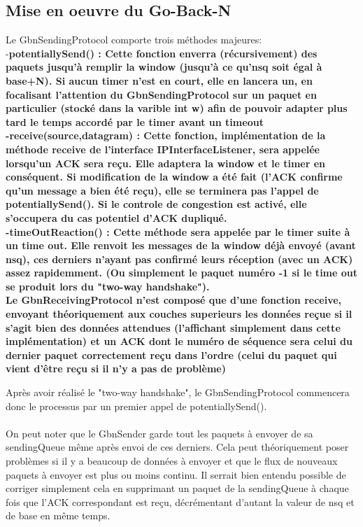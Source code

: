 \documentclass[11pt]{article}
\begin{document}
\subsection{Mise en oeuvre du Go-Back-N}
Le GbnSendingProtocol comporte trois méthodes majeures: \\
-\bfseries potentiallySend() \mdseries : Cette fonction enverra (récursivement) des paquets jusqu'à remplir la window (jusqu'à ce qu'nsq soit égal à base+N). Si aucun timer n'est en court, elle en lancera un, en focalisant l'attention du GbnSendingProtocol sur un paquet en particulier (stocké dans la varible int w) afin de pouvoir adapter plus tard le temps accordé par le timer avant un timeout \\
-\bfseries receive(source,datagram) \mdseries : Cette fonction, implémentation de la méthode receive de l'interface IPInterfaceListener, sera appelée lorsqu'un ACK sera reçu. Elle adaptera la window et le timer en conséquent. Si modification de la window a été fait (l'ACK confirme qu'un message a bien été reçu), elle se terminera pas l'appel de potentiallySend(). Si le controle de congestion est activé, elle s'occupera du cas potentiel d'ACK dupliqué. \\
-\bfseries timeOutReaction() \mdseries : Cette méthode sera appelée par le timer suite à un time out. Elle renvoit les messages de la window déjà envoyé (avant nsq), ces derniers n'ayant pas confirmé leurs réception (avec un ACK) assez rapidemment. (Ou simplement le paquet numéro -1 si le time out se produit lors du "two-way handshake").\\

Le GbnReceivingProtocol n'est composé que d'une fonction receive, envoyant théoriquement aux couches superieurs les données reçue si il s'agit bien des données attendues (l'affichant simplement dans cette implémentation) et un ACK dont le numéro de séquence sera celui du dernier paquet correctement reçu dans l'ordre (celui du paquet qui vient d'être reçu si il n'y a pas de problème)

Après avoir réalisé le "two-way handshake", le GbnSendingProtocol commencera donc le processus par un premier appel de potentiallySend(). \\ \\
On peut noter que le GbnSender garde tout les paquets à envoyer de sa sendingQueue même après envoi de ces derniers. Cela peut théoriquement poser problèmes si il y a beaucoup de données à envoyer et que le flux de nouveaux paquets à envoyer est plus ou moins continu. Il serrait bien entendu possible de corriger simplement cela en supprimant un paquet de la sendingQueue à chaque fois que l'ACK correspondant est reçu, décrémentant d'autant la valeur de nsq et de base en même temps.
\end{document}

